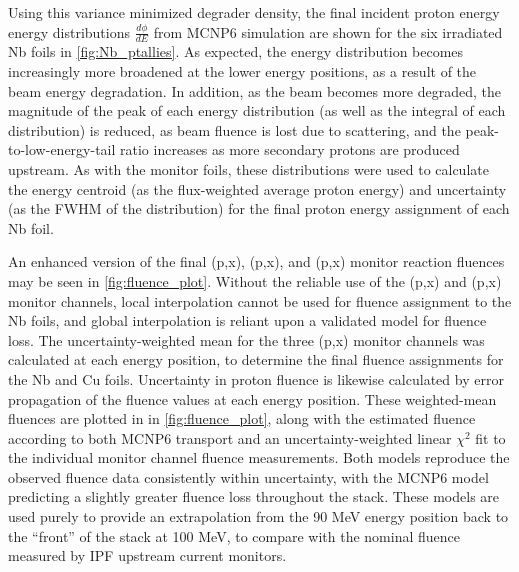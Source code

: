 Using this variance minimized degrader density, the final incident proton energy energy distributions $\frac{d\phi}{dE}$ from MCNP6 simulation are shown for the six irradiated Nb foils in \autoref{fig:Nb_ptallies}. 
As expected, the energy distribution becomes increasingly more broadened at the lower energy positions, as a result of the beam energy degradation.
In addition, as the beam becomes more degraded, the magnitude of the peak of each energy distribution (as well as the integral of each distribution) is reduced, as beam fluence is lost due to scattering, and the peak-to-low-energy-tail ratio increases as more  secondary protons are produced upstream.
As with the monitor foils, these distributions were used to calculate the  energy centroid  (as the  flux-weighted average proton  energy) and  uncertainty (as the FWHM of the distribution) for the final proton energy assignment of each Nb foil.





An enhanced version of the final (p,x), (p,x), and (p,x) monitor reaction fluences may be seen in \autoref{fig:fluence_plot}.
Without the reliable use of the  (p,x) and (p,x) monitor channels, local interpolation cannot be used for fluence assignment to the Nb foils, and global interpolation is reliant upon a validated model for fluence loss.
The uncertainty-weighted mean  for the three (p,x) monitor channels was calculated at each energy position, to determine the final fluence assignments for the Nb and Cu foils.
Uncertainty in proton fluence  is likewise calculated by error propagation of the fluence values  at each energy position.
These weighted-mean fluences are  plotted in in \autoref{fig:fluence_plot}, along with the estimated fluence according to both  MCNP6 transport 
and an uncertainty-weighted linear $\chi^2$ fit to the individual monitor channel fluence measurements.
Both models reproduce the observed fluence data consistently within uncertainty, with the MCNP6 model predicting a slightly greater fluence loss throughout the stack.
These models are used purely to provide an extrapolation from the 90 MeV energy position back to the \enquote{front} of the stack at 100 MeV, to compare with the nominal fluence measured by  IPF upstream current monitors.


